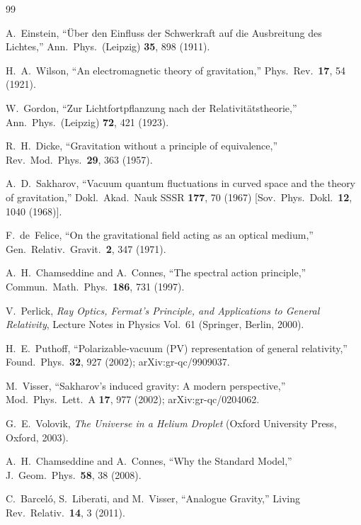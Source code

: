 \documentclass[aps,prd,twocolumn,superscriptaddress,nofootinbib]{revtex4-2}
\begin{document}
\begin{thebibliography}{99}

A.~Einstein,
``\"{U}ber den Einfluss der Schwerkraft auf die Ausbreitung des Lichtes,''
Ann.\ Phys.\ (Leipzig) \textbf{35}, 898 (1911).

H.~A.~Wilson,
``An electromagnetic theory of gravitation,''
Phys.\ Rev.\ \textbf{17}, 54 (1921).

W.~Gordon,
``Zur Lichtfortpflanzung nach der Relativit\"{a}tstheorie,''
Ann.\ Phys.\ (Leipzig) \textbf{72}, 421 (1923).

R.~H.~Dicke,
``Gravitation without a principle of equivalence,''
Rev.\ Mod.\ Phys.\ \textbf{29}, 363 (1957).

A.~D.~Sakharov,
``Vacuum quantum fluctuations in curved space and the theory of
gravitation,''
Dokl.\ Akad.\ Nauk SSSR \textbf{177}, 70 (1967)
[Sov.\ Phys.\ Dokl.\ \textbf{12}, 1040 (1968)].

F.~de~Felice,
``On the gravitational field acting as an optical medium,''
Gen.\ Relativ.\ Gravit.\ \textbf{2}, 347 (1971).

A.~H.~Chamseddine and A.~Connes,
``The spectral action principle,''
Commun.\ Math.\ Phys.\ \textbf{186}, 731 (1997).

V.~Perlick,
\emph{Ray Optics, Fermat's Principle, and Applications to General
Relativity},
Lecture Notes in Physics Vol.~61 (Springer, Berlin, 2000).

H.~E.~Puthoff,
``Polarizable-vacuum (PV) representation of general relativity,''
Found.\ Phys.\ \textbf{32}, 927 (2002);
arXiv:gr-qc/9909037.

M.~Visser,
``Sakharov's induced gravity: A modern perspective,''
Mod.\ Phys.\ Lett.\ A \textbf{17}, 977 (2002);
arXiv:gr-qc/0204062.

G.~E.~Volovik,
\emph{The Universe in a Helium Droplet}
(Oxford University Press, Oxford, 2003).

A.~H.~Chamseddine and A.~Connes,
``Why the Standard Model,''
J.\ Geom.\ Phys.\ \textbf{58}, 38 (2008).

C.~Barcel\'{o}, S.~Liberati, and M.~Visser,
``Analogue Gravity,''
Living Rev.\ Relativ.\ \textbf{14}, 3 (2011).


\end{thebibliography}
\end{document}
